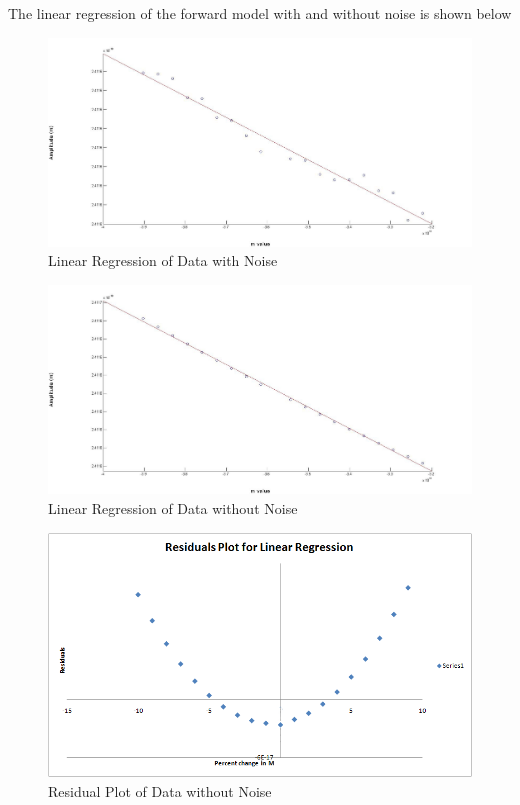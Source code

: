 The linear regression of the forward model with and without noise is shown below
\begin{figure}
\begin{center}
\includegraphics[scale=0.25]{images/chapter_5/forward/linear.jpg}
\caption{Linear Regression of Data with Noise}
\end{center}
\end{figure}
\begin{figure}
\begin{center}
\includegraphics[scale=0.25]{images/chapter_5/forward/linear_nonoise.jpg}
\caption{Linear Regression of Data without Noise}
\end{center}
\end{figure}

\begin{figure}
\begin{center}
\includegraphics[scale=0.5]{images/chapter_5/forward/regression.png}
\caption{Residual Plot of Data without Noise}
\end{center}
\end{figure}

